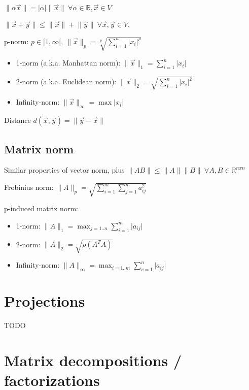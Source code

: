\documentclass[]{article}
\begin{document}
	$\lVert \alpha \vec{x} \rVert = \lvert \alpha \rvert \lVert \vec{x} \rVert \ \forall \alpha \in \mathbb{R}, \vec{x} \in V$
	
	$\lVert \vec{x}+\vec{y} \rVert \le \lVert \vec{x} \rVert + \lVert \vec{y} \rVert \ \forall \vec{x},\vec{y} \in V$.
	
	p-norm: $p\in [1,\infty[, \ \lVert \vec{x} \rVert_p = \sqrt[p]{\sum_{i=1}^n \lvert x_i \rvert^p}$
	\begin{itemize}
		\item 1-norm (a.k.a. Manhattan norm): $\lVert \vec{x} \rVert_1 = \sum_{i=1}^n \lvert x_i \rvert$
		\item 2-norm (a.k.a. Euclidean norm): $\lVert \vec{x} \rVert_2 = \sqrt{\sum_{i=1}^n \lvert x_i \rvert^2}$
		\item Infinity-norm: $\lVert \vec{x} \rVert_\infty = \max{\lvert x_i \rvert}$
	\end{itemize}

	Distance $d(\vec{x},\vec{y}) = \lVert \vec{y}-\vec{x} \rVert$

	\subsection{Matrix norm}
	
	Similar properties of vector norm, plus $\lVert A B \rVert \le \lVert A \rVert \lVert B \rVert \ \forall A,B\in \mathbb{R}^{nxn}$
	 
	Frobinius norm: $\lVert A \rVert_p = \sqrt{\sum_{i=1}^m \sum_{j=1}^n a_{ij}^2}$
	
	p-induced matrix norm: 
	\begin{itemize}
		\item 1-norm: $\lVert A \rVert_1 = \max_{j=1..n}\sum_{i=1}^m \lvert a_{ij} \rvert$
		\item 2-norm: $\lVert A \rVert_2 = \sqrt{\rho(A^T A)}$
		\item Infinity-norm: $\lVert A \rVert_\infty = \max_{i=1..m}\sum_{v=1}^n \lvert a_{ij} \rvert$
	\end{itemize}
	
	\section{Projections}
	
	TODO
	
	\section{Matrix decompositions / factorizations}
	
\end{document}
